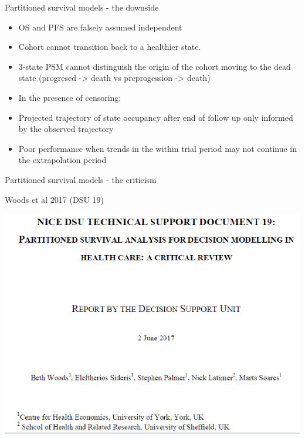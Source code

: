 \documentclass[ignorenonframetext,]{beamer}
\providecommand{\tightlist}{%
  \setlength{\itemsep}{0pt}\setlength{\parskip}{0pt}}
\begin{document}
\begin{frame}{Partitioned survival models - the downside}

\begin{itemize}
\tightlist
\item
  OS and PFS are falsely assumed independent
\item
  Cohort cannot transition back to a healthier state.
\item
  3-state PSM cannot distinguish the origin of the cohort moving to the
  dead state (progresed -\textgreater{} death vs preprogession
  -\textgreater{} death)
\item
  In the presence of censoring:
\item
  Projected trajectory of state occupancy after end of follow up only
  informed by the observed trajectory
\item
  Poor performance when trends in the within trial period may not
  continue in the extrapolation period
\end{itemize}

\end{frame}

\begin{frame}{Partitioned survival models - the criticism}

Woods et al 2017 (DSU 19)

\includegraphics[width=1\linewidth]{figures/psmcritic}

\end{frame}
\end{document}

